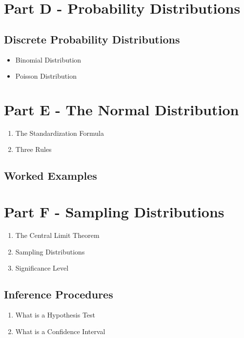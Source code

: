 \documentclass[]{article}
\begin{document}
\section{Part D - Probability Distributions}

\subsection{Discrete Probability Distributions}
\begin{itemize}
\item Binomial Distribution
\item Poisson Distribution
\end{itemize}

\section{Part E - The Normal Distribution}

\begin{enumerate}
\item The Standardization Formula
\item Three Rules
\end{enumerate}
\subsection{Worked Examples}
\section{Part F - Sampling Distributions}
\begin{enumerate}
\item The Central Limit Theorem
\item Sampling Distributions
\item Significance Level
\end{enumerate}
\subsection{Inference Procedures}
\begin{enumerate}
\item What is a Hypothesis Test
\item What is a Confidence Interval
\end{enumerate}

\end{document}
